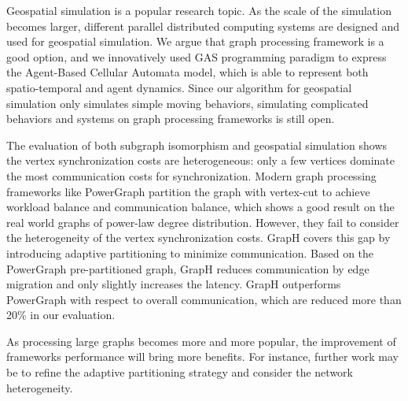 Geospatial simulation is a popular research topic. As the scale of the simulation becomes larger, different parallel distributed computing systems are designed and used for geospatial simulation. We argue that graph processing framework is a good option, and we innovatively used GAS programming paradigm to express the Agent-Based Cellular Automata model, which is able to represent both spatio-temporal and agent dynamics. Since our algorithm for geospatial simulation only simulates simple moving behaviors, simulating complicated behaviors and systems on graph processing frameworks is still open.


The evaluation of both subgraph isomorphism and geospatial simulation shows the vertex synchronization costs are heterogeneous: only a few vertices dominate the most communication costs for synchronization. Modern graph processing frameworks like PowerGraph partition the graph with vertex-cut to achieve workload balance and communication balance, which shows a good result on the real world graphs of power-law degree distribution. However, they fail to consider the heterogeneity of the vertex synchronization costs. GrapH covers this gap by introducing adaptive partitioning to minimize communication. Based on the PowerGraph pre-partitioned graph, GrapH reduces communication by edge migration and only slightly increases the latency. GrapH outperforms PowerGraph with respect to overall communication, which are reduced more than 20\% in our evaluation.

As processing large graphs becomes more and more popular, the improvement of frameworks performance will bring more benefits. For instance, further work may be to refine the adaptive partitioning strategy and consider the network heterogeneity.
